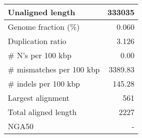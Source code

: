 \documentclass[12pt,a4paper]{article}
\begin{document}
\begin{table}[ht]
\begin{center}
\begin{tabular}{|l*{1}{|r}|}
Unaligned length & 333035 \\ \hline
Genome fraction (\%) & 0.060 \\ \hline
Duplication ratio & 3.126 \\ \hline
\# N's per 100 kbp & 0.00 \\ \hline
\# mismatches per 100 kbp & 3389.83 \\ \hline
\# indels per 100 kbp & 145.28 \\ \hline
Largest alignment & 561 \\ \hline
Total aligned length & 2227 \\ \hline
NGA50 & - \\ \hline
\end{tabular}
\end{center}
\end{table}
\end{document}
